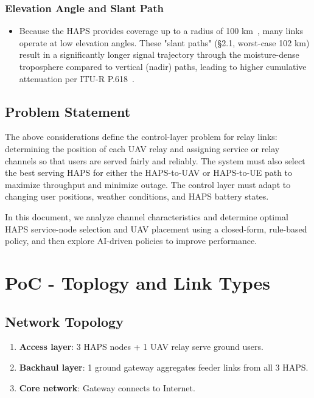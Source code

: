 \documentclass[conference]{IEEEtran}
\begin{document}
\subsubsection{Elevation Angle and Slant Path}
\begin{itemize}
\item[] Because the HAPS provides coverage up to a radius of 100 km~\cite{itu_m2106}, many links operate at low elevation angles. These "slant paths" (§2.1, worst-case 102 km) result in a significantly longer signal trajectory through the moisture-dense troposphere compared to vertical (nadir) paths, leading to higher cumulative attenuation per ITU-R P.618~\cite{itu_p618}.
\end{itemize}

\subsection{Problem Statement}
The above considerations define the control-layer problem for relay links: determining the position of each UAV relay and assigning service or relay channels so that users are served fairly and reliably. The system must also select the best serving HAPS for either the HAPS-to-UAV or HAPS-to-UE path to maximize throughput and minimize outage. The control layer must adapt to changing user positions, weather conditions, and HAPS battery states. 

In this document, we analyze channel characteristics and determine optimal HAPS service-node selection and UAV placement using a closed-form, rule-based policy, and then explore AI-driven policies to improve performance.

\section{PoC - Toplogy and Link Types}

\subsection{Network Topology}

\begin{enumerate}
  \item \textbf{Access layer}: 3 HAPS nodes + 1 UAV relay serve ground users.
  \item \textbf{Backhaul layer}: 1 ground gateway aggregates feeder links from all 3 HAPS.
  \item \textbf{Core network}: Gateway connects to Internet.
\end{enumerate}
\end{document}
